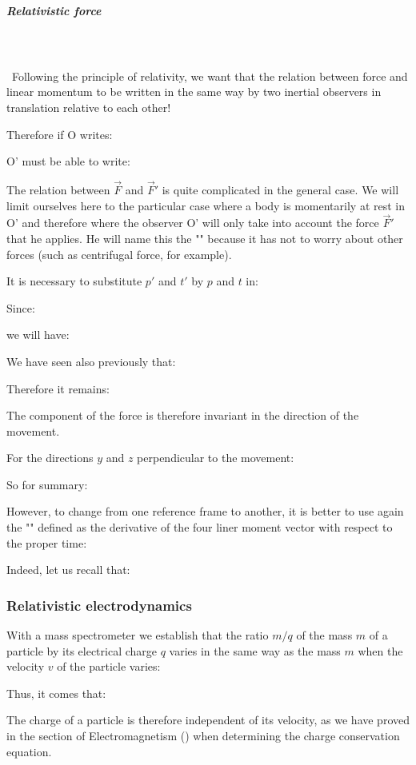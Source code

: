 	\subparagraph{Relativistic force}\mbox{}\\\\\
	Following the principle of relativity, we want that the relation between force and linear momentum to be written in the same way by two inertial observers in translation relative to each other!

	Therefore if O writes:
	
	O' must be able to write:
	
	The relation between $\vec{F}$ and $\vec{F}'$ is quite complicated in the general case. We will limit ourselves here to the particular case where a body is momentarily at rest in O' and therefore where the observer O' will only take into account the force $\vec{F}'$ that he applies. He will name this the "" because it has not to worry about other forces (such as centrifugal force, for example).

	It is necessary to substitute $p'$ and $t'$ by $p$ and $t$ in:
	
	Since:
	
	we will have:
	
	We have seen also previously that:
	
	Therefore it remains:
	
	The component of the force is therefore invariant in the direction of the movement.

	For the directions $y$ and $z$ perpendicular to the movement:
	
	So for summary:
	
	However, to change from one reference frame to another, it is better to use again the "" defined as the derivative of the four liner moment vector with respect to the proper time:
	
	Indeed, let us recall that:
	
	
	\pagebreak
	\subsubsection{Relativistic electrodynamics}
	With a mass spectrometer we establish that the ratio $m / q$ of the mass $m$ of a particle by its electrical charge $q$ varies in the same way as the mass $m$ when the velocity $v$ of the particle varies:
	
	Thus, it comes that:
	
	The charge of a particle is therefore independent of its velocity, as we have proved in the section of Electromagnetism () when determining the charge conservation equation.


